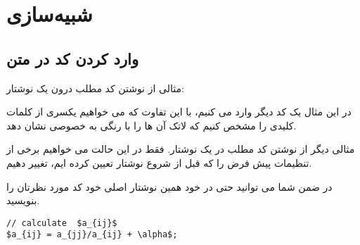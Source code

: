 \chapter{شبیه‌سازی}
\label{chap:simulation}

\section{وارد کردن کد در متن}
مثالی از نوشتن کد مطلب درون یک نوشتار:

\begin{latin}

\end{latin}

در این مثال یک کد  دیگر وارد می کنیم، با این تفاوت که می خواهیم یکسری از کلمات کلیدی را مشخص کنیم که لاتک آن ها را با رنگی به خصوصی نشان دهد. 
\begin{latin}

\end{latin}

مثالی دیگر از نوشتن کد مطلب در یک نوشتار. فقط در این حالت می خواهیم برخی از تنظیمات پیش فرض را که قبل از شروع نوشتار تعیین کرده ایم، تغییر دهیم. 
\begin{latin}

\end{latin}

در ضمن شما می توانید حتی در خود همین نوشتار اصلی خود کد مورد نظرتان را بنویسید. 
\begin{latin}
\begin{lstlisting}[mathescape=true]
// calculate  $a_{ij}$
$a_{ij} = a_{jj}/a_{ij} + \alpha$;
\end{lstlisting}
\end{latin}